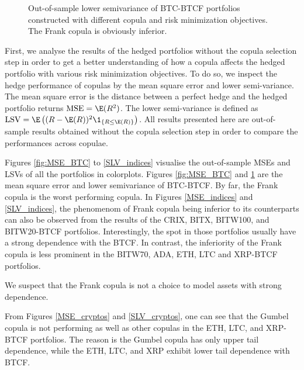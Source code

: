\begin{figure}[t]
\begin{minipage}[t]{.475\textwidth}
      \caption{Out-of-sample lower semivariance of BTC-BTCF portfolios constructed with different copula and risk minimization objectives.
      The Frank copula is obviously inferior.}
    \label{fig:SLV_BTC}
    \end{minipage}
    \end{figure}  

First, we analyse the results of the hedged portfolios without the
copula selection step in order to get a better understanding of how a
copula affects the hedged portfolio with various risk minimization
objectives.
To do so, we inspect the hedge performance of copulas by
the mean square error and lower semi-variance.
The mean square error
is the distance between a perfect hedge and the hedged portfolio
returns $\operatorname{MSE}= \E(R^2)$.
The lower semi-variance is defined as
$\operatorname{LSV}=\E \left( (R-\E(R))^2 \1_{\{R\leq \E(R)\}} \right)$.
All results presented here are out-of-sample results obtained without
the copula selection step in order to compare the performances across
copulae.

Figures \ref{fig:MSE_BTC} to \ref{SLV_indices} visualise the out-of-sample MSEs and LSVs of all the portfolios in colorplots.
Figures \ref{fig:MSE_BTC} and \ref{fig:SLV_BTC} are the mean square
error and lower semivariance of BTC-BTCF. By far, the Frank copula
is the worst performing copula.
In Figures \ref{MSE_indices} and \ref{SLV_indices}, the phenomenom
of Frank copula being inferior to its counterparts can also be observed
from the results of the CRIX, BITX, BITW100, and BITW20-BTCF
portfolios.
Interestingly, the spot in those portfolios usually have a strong
dependence with the BTCF.
In contrast, the inferiority of the Frank copula is less prominent in
the BITW70, ADA, ETH, LTC and XRP-BTCF portfolios.

We suspect that the Frank copula is not a choice to model assets with
strong dependence.

From Figures \ref{MSE_cryptos} and
\ref{SLV_cryptos}, one can see that the Gumbel copula is not performing as well as
other copulas in the ETH, LTC, and XRP-BTCF portfolios.
The reason is the Gumbel copula has only upper tail dependence,
while the ETH, LTC, and XRP exhibit lower tail dependence with BTCF.

